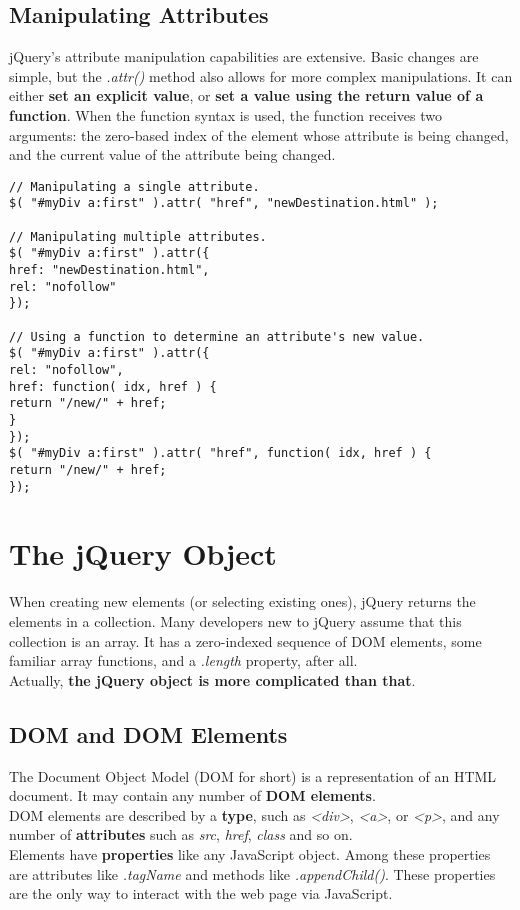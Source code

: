 \documentclass[10pt,letterpaper]{book}
\begin{document}
\subsection{Manipulating Attributes}
jQuery's attribute manipulation capabilities are extensive. Basic changes are simple, but the \textit{.attr()} method also allows for more complex manipulations. It can either \textbf{set an explicit value}, or \textbf{set a value using the return value of a function}. When the function syntax is used, the function receives two arguments: the zero-based index of the element whose attribute is being changed, and the current value of the attribute being changed.
\begin{lstlisting}
// Manipulating a single attribute.
$( "#myDiv a:first" ).attr( "href", "newDestination.html" );

// Manipulating multiple attributes.
$( "#myDiv a:first" ).attr({
href: "newDestination.html",
rel: "nofollow"
});

// Using a function to determine an attribute's new value.
$( "#myDiv a:first" ).attr({
rel: "nofollow",
href: function( idx, href ) {
return "/new/" + href;
}
});
$( "#myDiv a:first" ).attr( "href", function( idx, href ) {
return "/new/" + href;
});
\end{lstlisting}
\section{The jQuery Object}
When creating new elements (or selecting existing ones), jQuery returns the elements in a collection. Many developers new to jQuery assume that this collection is an array. It has a zero-indexed sequence of DOM elements, some familiar array functions, and a \textit{.length} property, after all.\\
Actually, \textbf{the jQuery object is more complicated than that}.\\
\subsection{DOM and DOM Elements}
The Document Object Model (DOM for short) is a representation of an HTML document. It may contain any number of \textbf{DOM elements}.\\
DOM elements are described by a \textbf{type}, such as \textit{<div>}, \textit{<a>}, or \textit{<p>}, and any number of \textbf{attributes} such as \textit{src}, \textit{href}, \textit{class} and so on.\\
Elements have \textbf{properties} like any JavaScript object. Among these properties are attributes like \textit{.tagName} and methods like \textit{.appendChild()}. These properties are the only way to interact with the web page via JavaScript.\\
\end{document}
